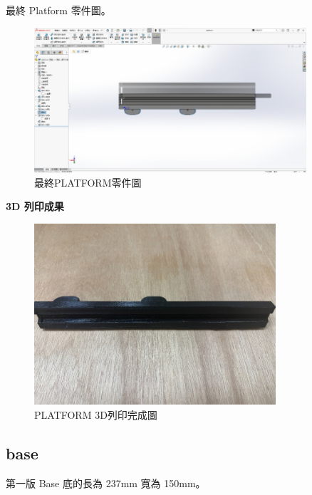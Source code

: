 \newpage


最終 Platform 零件圖。

\begin{figure}[htbp]
    \centering
    \includegraphics[width=0.9\textwidth]{./../images/6-1-22}
    \caption{最終PLATFORM零件圖}
\end{figure}

\textbf{3D 列印成果}

\begin{figure}[htbp]
    \centering
    \includegraphics[width=0.8\textwidth]{./../images/6-1-26}
    \caption{PLATFORM 3D列印完成圖}
\end{figure}

\newpage

\subsection{base}

第一版 Base 底的長為 237mm 寬為 150mm。

